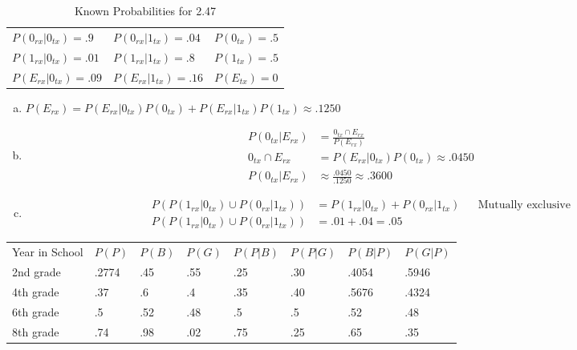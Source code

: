 \documentclass[12pt]{article}
\newenvironment{problem}[2][Problem]{\begin{trivlist}
\item[\hskip \labelsep {\bfseries #1}\hskip \labelsep {\bfseries #2.}]
  \vspace{1 cm}
}{\end{trivlist}}
\begin{document}
\begin{problem}{2.47}
\item
    \begin{table}[!htpb]
      \centering
      \caption{Known Probabilities for 2.47}
        \label{probs_2_4}
        \begin{tabular}{lll}
          $P(0_{rx}|0_{tx}) = .9$  & $P(0_{rx}|1_{tx}) = .04$ & $P(0_{tx}) = .5$ \\
          $P(1_{rx}|0_{tx}) = .01$ & $P(1_{rx}|1_{tx}) = .8$  & $P(1_{tx}) = .5$ \\
          $P(E_{rx}|0_{tx}) = .09$ & $P(E_{rx}|1_{tx}) = .16$ & $P(E_{tx}) = 0$ 
        \end{tabular}
    \end{table}
  \begin{enumerate}[a.]
    \item %
            $P(E_{rx}) = P(E_{rx}|0_{tx})P(0_{tx}) + P(E_{rx}|1_{tx})P(1_{tx}) \approx .1250$
    \item %
      \begin{align*}
        P(0_{tx}|E_{rx}) &= \frac{0_{tx} \cap E_{rx}}{P(E_{rx})} \\
        0_{tx} \cap E_{rx} &= P(E_{rx}|0_{tx})P(0_{tx}) \approx .0450 \\
        P(0_{tx}|E_{rx}) &\approx \frac{.0450}{.1250} \approx .3600
      \end{align*}
    \item %
      \begin{align*}
        P(P(1_{rx}|0_{tx})\cup P(0_{rx}|1_{tx})) &= P(1_{rx}|0_{tx}) + P(0_{rx}|1_{tx}) & & \textrm{Mutually exclusive} \\
        P(P(1_{rx}|0_{tx})\cup P(0_{rx}|1_{tx})) &= .01 + .04 = .05 
      \end{align*}
  \end{enumerate}
\end{problem}

\begin{problem}{2.49}
\item
  \begin{table}[!htbp]
    \centering
    \begin{tabular}{llllllll}
      Year in School & $P(P)$ & $P(B)$ & $P(G)$ & $P(P|B)$ & $P(P|G)$ & $P(B|P)$ & $P(G|P)$ \\
      2nd grade      & .2774  & .45    & .55    & .25      & .30      & .4054    & .5946    \\
      4th grade      & .37    & .6     & .4     & .35      & .40      & .5676    & .4324    \\
      6th grade      & .5     & .52    & .48    & .5       & .5       & .52      & .48      \\
      8th grade      & .74    & .98    & .02    & .75      & .25      & .65      & .35     
    \end{tabular}
  \end{table}
\end{problem}
\end{document}
